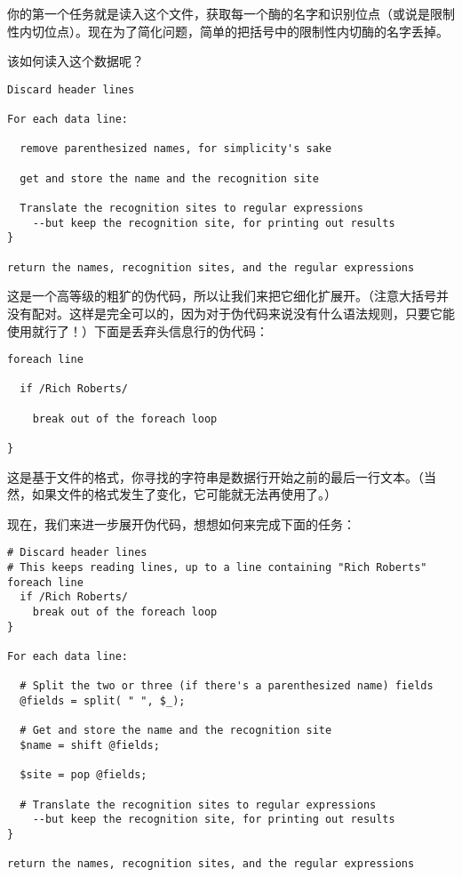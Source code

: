 你的第一个任务就是读入这个文件，获取每一个酶的名字和识别位点（或说是限制性内切位点）。现在为了简化问题，简单的把括号中的限制性内切酶的名字丢掉。

该如何读入这个数据呢？

\begin{lstlisting}
Discard header lines 

For each data line:

  remove parenthesized names, for simplicity's sake

  get and store the name and the recognition site

  Translate the recognition sites to regular expressions
    --but keep the recognition site, for printing out results
}

return the names, recognition sites, and the regular expressions
\end{lstlisting}

这是一个高等级的粗犷的伪代码，所以让我们来把它细化扩展开。（注意大括号并没有配对。这样是完全可以的，因为对于伪代码来说没有什么语法规则，只要它能使用就行了！）下面是丢弃头信息行的伪代码：

\begin{lstlisting}
foreach line 

  if /Rich Roberts/ 

    break out of the foreach loop

}
\end{lstlisting}

这是基于文件的格式，你寻找的字符串是数据行开始之前的最后一行文本。（当然，如果文件的格式发生了变化，它可能就无法再使用了。）

现在，我们来进一步展开伪代码，想想如何来完成下面的任务：

\begin{lstlisting}
# Discard header lines
# This keeps reading lines, up to a line containing "Rich Roberts"
foreach line 
  if /Rich Roberts/ 
    break out of the foreach loop
}

For each data line:

  # Split the two or three (if there's a parenthesized name) fields
  @fields = split( " ", $_);

  # Get and store the name and the recognition site
  $name = shift @fields;

  $site = pop @fields;

  # Translate the recognition sites to regular expressions
    --but keep the recognition site, for printing out results
}

return the names, recognition sites, and the regular expressions
\end{lstlisting}

